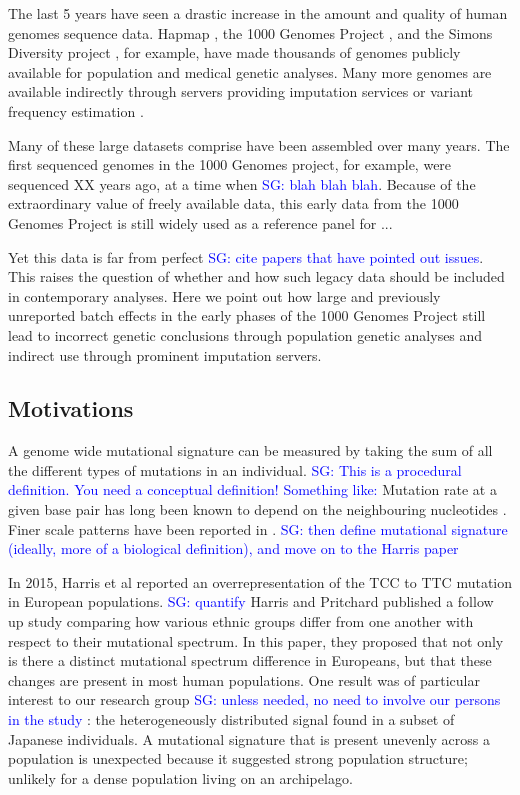 \documentclass[9pt,lineno]{elife}
\newcommand{\sgcomment}[1]{\textcolor{blue}{SG: #1}}
\begin{document}

The last 5 years have seen a drastic increase in the amount and quality of human genomes sequence data. Hapmap \cite{}, the 1000 Genomes Project \cite{}, and the Simons Diversity project \cite{}, for example, have made thousands of genomes publicly available for population and medical genetic analyses. Many more genomes are available indirectly through servers providing imputation services \cite{haplotype reference consortium} or variant frequency estimation \cite{GnomAD}. 

Many of these large datasets comprise have been assembled over many years. The first sequenced genomes in the 1000 Genomes project, for example, were sequenced XX years ago, at a time when \sgcomment{blah blah blah}. Because of the extraordinary value of freely available data, this early data from the 1000 Genomes Project is still widely used as a reference panel for ...

Yet this data is far from perfect \sgcomment{cite papers that have pointed out issues}. This raises the question of whether and how such legacy data should be included in contemporary analyses. Here we point out how large and previously unreported batch effects in the early phases of the 1000 Genomes Project still lead to incorrect genetic conclusions through population genetic analyses and indirect use through prominent imputation servers.  


\subsection{Motivations}

A genome wide mutational signature can be measured by taking the sum of all the different types of mutations in an individual. \sgcomment{This is a procedural definition. You need a conceptual definition! Something like:} Mutation rate at a given base pair has long been known to depend on the neighbouring nucleotides \cite{}. Finer scale patterns have been reported in \cite{}. \sgcomment {then define mutational signature (ideally, more of a biological definition), and move on to the Harris paper}



In 2015, Harris et al reported an overrepresentation of the TCC to TTC mutation in European populations. \sgcomment{quantify}
Harris and Pritchard published a follow up study comparing how various ethnic groups differ from one another with respect to their mutational spectrum. 
In this paper, they proposed that not only is there a distinct mutational spectrum difference in Europeans, but that these changes are present in most human populations. 
One result was of particular interest to our research group \sgcomment{unless needed, no need to involve our persons in the study} : the heterogeneously distributed signal found in a subset of Japanese individuals. 
A mutational signature that is present unevenly across a population is unexpected because it suggested strong population structure; unlikely for a dense population living on an archipelago.
\end{document}

